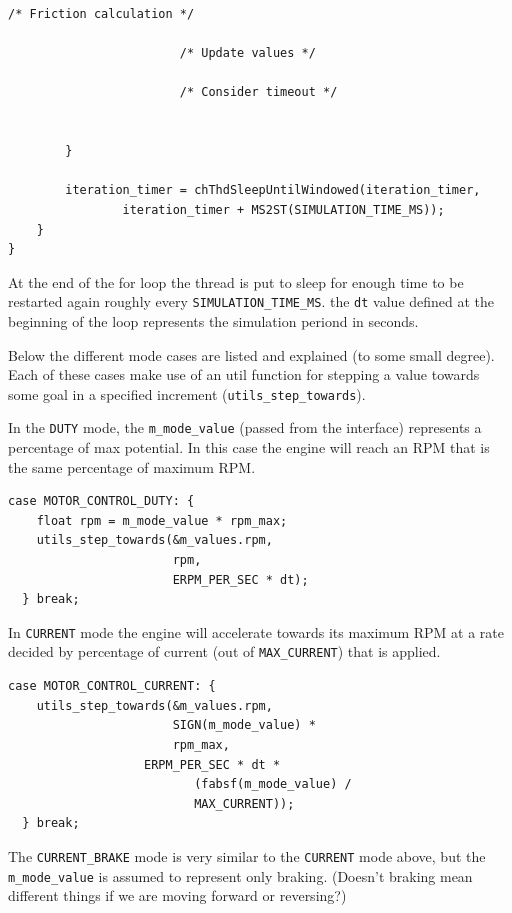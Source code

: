 \documentclass[12pt]{article} %
\begin{document}
{\begin{Verbatim}[samepage=false,frame=single,label=Embedded/RC\_Controller/motor\_sim.c]
                        /* Friction calculation */

                        /* Update values */

                        /* Consider timeout */
                        

		}

		iteration_timer = chThdSleepUntilWindowed(iteration_timer,
				iteration_timer + MS2ST(SIMULATION_TIME_MS));
	}
}
\end{Verbatim}

At the end of the for loop the thread is put to sleep for enough time
to be restarted again roughly every \verb!SIMULATION_TIME_MS!. the
\verb!dt! value defined at the beginning of the loop represents the
simulation periond in seconds.


Below the different mode cases are listed and explained (to some small
degree). Each of these cases make use of an util function for stepping
a value towards some goal in a specified increment
(\verb!utils_step_towards!).

In the \verb!DUTY! mode, the \verb!m_mode_value! (passed from the interface)
represents a percentage of max potential. In this case the engine will reach an
RPM that is the same percentage of maximum RPM.

\begin{Verbatim}[samepage=true,frame=single,label=Embedded/RC\_Controller/motor\_sim.c]
  case MOTOR_CONTROL_DUTY: {
    float rpm = m_mode_value * rpm_max;
    utils_step_towards(&m_values.rpm,
                       rpm,
                       ERPM_PER_SEC * dt);
  } break;
\end{Verbatim}

In \verb!CURRENT! mode the engine will accelerate towards its maximum
RPM at a rate decided by percentage of current (out of
\verb!MAX_CURRENT!) that is applied.

\begin{Verbatim}[samepage=true,frame=single,label=Embedded/RC\_Controller/motor\_sim.c]
  case MOTOR_CONTROL_CURRENT: {
    utils_step_towards(&m_values.rpm,
                       SIGN(m_mode_value) *
                       rpm_max,
	               ERPM_PER_SEC * dt *
                          (fabsf(m_mode_value) /
                          MAX_CURRENT));
  } break;
\end{Verbatim}

The \verb!CURRENT_BRAKE! mode is very similar to the \verb!CURRENT!
mode above, but the \verb!m_mode_value! is assumed to represent only
braking. (Doesn't braking mean different things if we are moving forward or reversing?) 

}
\end{document}
